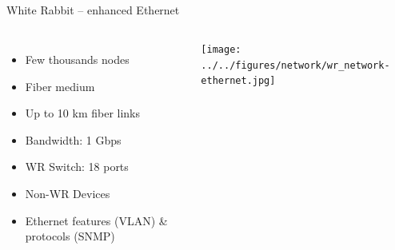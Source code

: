 \documentclass[compress,red]{beamer}
\begin{document}
\subsection{}
\begin{frame}{White Rabbit -- enhanced Ethernet}

\begin{columns}[c]
 

  \begin{itemize}
    \item Few thousands nodes
    \item Fiber medium
    \item Up to 10 km fiber links
    \item Bandwidth: 1 Gbps
    \item WR Switch: 18 ports
    \item Non-WR Devices
    \item Ethernet features (VLAN) \& protocols (SNMP)
  \end{itemize}

    \begin{center}
    \texttt{[image: ../../figures/network/wr\_network-ethernet.jpg]}
    

    \end{center}
\end{columns}

\end{frame}
\end{document}
